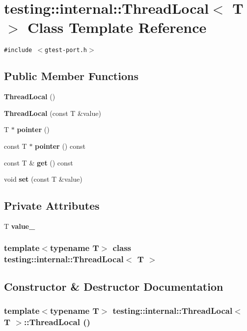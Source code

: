 \section{testing::internal::ThreadLocal$<$ T $>$ Class Template Reference}
\label{classtesting_1_1internal_1_1ThreadLocal}
{\tt \#include $<$gtest-port.h$>$}

\subsection*{Public Member Functions}
\begin{CompactItemize}
\item 
{\bf ThreadLocal} ()
\item 
{\bf ThreadLocal} (const T \&value)
\item 
T $\ast$ {\bf pointer} ()
\item 
const T $\ast$ {\bf pointer} () const
\item 
const T \& {\bf get} () const
\item 
void {\bf set} (const T \&value)
\end{CompactItemize}
\subsection*{Private Attributes}
\begin{CompactItemize}
\item 
T {\bf value\_\-}
\end{CompactItemize}
\subsubsection*{template$<$typename T$>$ class testing::internal::ThreadLocal$<$ T $>$}



\subsection{Constructor \& Destructor Documentation}
\subsubsection{\setlength{\rightskip}{0pt plus 5cm}template$<$typename T$>$ {\bf testing::internal::ThreadLocal}$<$ T $>$::{\bf ThreadLocal} ()\hspace{0.3cm}{\tt  [inline]}}\label{classtesting_1_1internal_1_1ThreadLocal_839bc830674be0f2e3fc58a24a378586}


